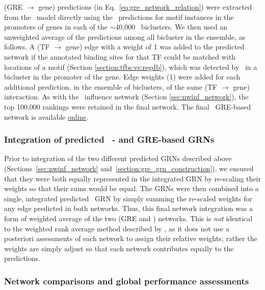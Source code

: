 (GRE $\rightarrow$ gene) predictions (in
Eq.~\ref{eq:gre_network_relation}) were extracted from the
\egrine\ model directly using the \MEME\ predictions for motif
instances in the promoters of genes in each of the $\sim$40,000
\cm\ biclusters. We then used an unweighted average of the predictions
among all bicluster in the ensemble, as follows. A (TF $\rightarrow$
gene) edge with a weight of 1 was added to the predicted network if
the annotated binding sites for that TF could be matched with
locations of a motif (Section \ref{section:tfbs:vs:regdb}), which was
detected by \MEME\ in a bicluster in the promoter of the gene. Edge
weights (1) were added for each additional prediction, in the ensemble
of biclusters, of the same (TF $\rightarrow$ gene) interaction. As
with the \nwinf~influence network (Section \ref{sec:nwinf_network}), the top
100,000 rankings were retained in the final network. The final
\egrine~GRE-based network is available 
\href{http://egrin2.systemsbiology.net/}{online}.

\subsubsection{Integration of predicted \egrine~\nwinf- and GRE-based GRNs}

Prior to integration of the two different predicted GRNs described
above (Sections~\ref{sec:nwinf_network}
and~\ref{section:gre_grn_construction}), we ensured that they were
both equally represented in the integrated GRN by re-scaling their
weights so that their sums would be equal. The GRNs were then combined
into a single, integrated predicted \egrine\ GRN by simply summing the
re-scaled weights for any edge predicted in both networks. Thus, this
final network integration was a form of weighted average of the two
(GRE and \nwinf) networks. This is {\it not} identical to the weighted
rank average method described by \cite{Marbach2012}, as it does not
use a posteriori assessments of each network to assign their relative
weights; rather the weights are simply adjust so that each network
contributes equally to the predictions.

\subsubsection{Network comparisons and global performance assessments}
\label{sec:network_comparisons}


